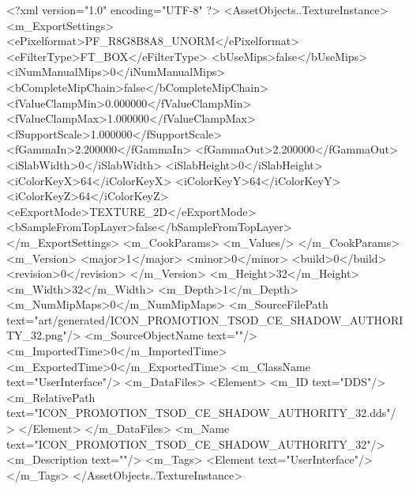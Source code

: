<?xml version="1.0" encoding="UTF-8" ?>
<AssetObjects..TextureInstance>
	<m_ExportSettings>
		<ePixelformat>PF_R8G8B8A8_UNORM</ePixelformat>
		<eFilterType>FT_BOX</eFilterType>
		<bUseMips>false</bUseMips>
		<iNumManualMips>0</iNumManualMips>
		<bCompleteMipChain>false</bCompleteMipChain>
		<fValueClampMin>0.000000</fValueClampMin>
		<fValueClampMax>1.000000</fValueClampMax>
		<fSupportScale>1.000000</fSupportScale>
		<fGammaIn>2.200000</fGammaIn>
		<fGammaOut>2.200000</fGammaOut>
		<iSlabWidth>0</iSlabWidth>
		<iSlabHeight>0</iSlabHeight>
		<iColorKeyX>64</iColorKeyX>
		<iColorKeyY>64</iColorKeyY>
		<iColorKeyZ>64</iColorKeyZ>
		<eExportMode>TEXTURE_2D</eExportMode>
		<bSampleFromTopLayer>false</bSampleFromTopLayer>
	</m_ExportSettings>
	<m_CookParams>
		<m_Values/>
	</m_CookParams>
	<m_Version>
		<major>1</major>
		<minor>0</minor>
		<build>0</build>
		<revision>0</revision>
	</m_Version>
	<m_Height>32</m_Height>
	<m_Width>32</m_Width>
	<m_Depth>1</m_Depth>
	<m_NumMipMaps>0</m_NumMipMaps>
	<m_SourceFilePath text="art/generated/ICON_PROMOTION_TSOD_CE_SHADOW_AUTHORITY_32.png"/>
	<m_SourceObjectName text=""/>
	<m_ImportedTime>0</m_ImportedTime>
	<m_ExportedTime>0</m_ExportedTime>
	<m_ClassName text="UserInterface"/>
	<m_DataFiles>
		<Element>
			<m_ID text="DDS"/>
			<m_RelativePath text="ICON_PROMOTION_TSOD_CE_SHADOW_AUTHORITY_32.dds"/>
		</Element>
	</m_DataFiles>
	<m_Name text="ICON_PROMOTION_TSOD_CE_SHADOW_AUTHORITY_32"/>
	<m_Description text=""/>
	<m_Tags>
		<Element text="UserInterface"/>
	</m_Tags>
</AssetObjects..TextureInstance>
